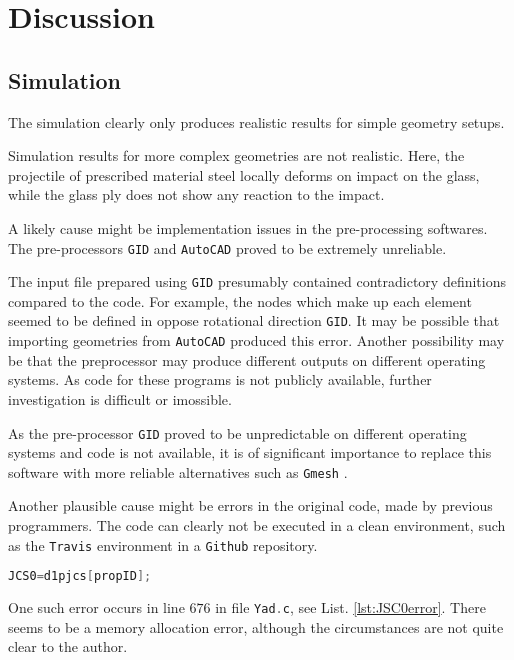 \section{Discussion}
\label{sec:discussion}

\subsection{Simulation}
\label{subsec:sim}

The simulation clearly only produces realistic results for simple geometry setups. 

\bigbreak
Simulation results for more complex geometries are not realistic. Here, the projectile of prescribed material steel locally deforms on impact on the glass, while the glass ply does not show any reaction to the impact.

\bigbreak
A likely cause might be implementation issues in the pre-processing softwares. The pre-processors \texttt{GID} and \texttt{AutoCAD} proved to be extremely unreliable. 

\bigbreak
The input file prepared using \texttt{GID} presumably contained contradictory definitions compared to the code. For example, the nodes which make up each element seemed to be defined in oppose rotational direction \texttt{GID}. It may be possible that importing geometries from \texttt{AutoCAD} produced this error. Another possibility may be that the preprocessor may produce different outputs on different operating systems. As code for these programs is not publicly available, further investigation is difficult or imossible.  

\bigbreak
As the pre-processor \texttt{GID} proved to be unpredictable on different operating systems and code is not available, it is of significant importance to replace this software with more reliable alternatives such as \texttt{Gmesh} \cite{Geu09}.

\bigbreak
Another plausible cause might be errors in the original code, made by previous programmers. The code can clearly not be executed in a clean environment, such as the \texttt{Travis} environment in a \texttt{Github} repository. 

\begin{lstlisting}[language=C, caption=Memory allocation error for variable \texttt{JCS0} in file \texttt{Yrd.c}, label=lst:JSC0error]
JCS0=d1pjcs[propID];
\end{lstlisting}

One such error occurs in line $676$ in file \lstinline[language=C]{Yad.c}, see List. \ref{lst:JSC0error}. There seems to be a memory allocation error, although the circumstances are not quite clear to the author.

